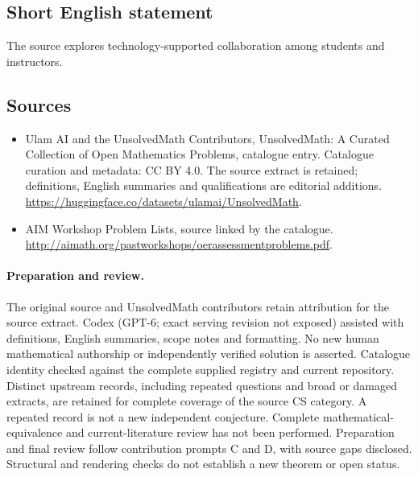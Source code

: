 \documentclass[11pt]{article}
\begin{document}
\subsection{Short English statement}
The source explores technology-supported collaboration among students and instructors.
\subsection{Sources}
\begin{itemize}
\item[\hypertarget{source:statement:1}{S1}] Ulam AI and the UnsolvedMath Contributors, UnsolvedMath: A Curated Collection of Open Mathematics Problems, catalogue entry. Catalogue curation and metadata: CC BY 4.0. The source extract is retained; definitions, English summaries and qualifications are editorial additions.
\url{https://huggingface.co/datasets/ulamai/UnsolvedMath}.
\item[\hypertarget{source:statement:2}{S2}] AIM Workshop Problem Lists, source linked by the catalogue.
\url{http://aimath.org/pastworkshops/oerassessmentproblems.pdf}.
\end{itemize}
\paragraph{Preparation and review.}
The original source and UnsolvedMath contributors retain attribution for the source extract. Codex (GPT-6; exact serving revision not exposed) assisted with definitions, English summaries, scope notes and formatting. No new human mathematical authorship or independently verified solution is asserted. Catalogue identity checked against the complete supplied registry and current repository. Distinct upstream records, including repeated questions and broad or damaged extracts, are retained for complete coverage of the source CS category. A repeated record is not a new independent conjecture. Complete mathematical-equivalence and current-literature review has not been performed. Preparation and final review follow contribution prompts C and D, with source gaps disclosed. Structural and rendering checks do not establish a new theorem or open status.
\label{end:statement}
\end{document}
